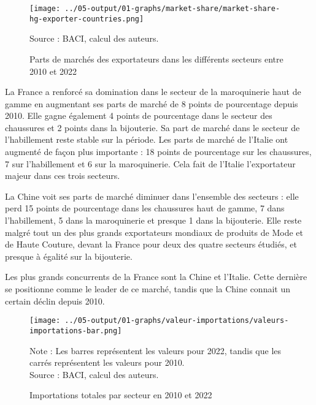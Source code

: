 \documentclass[french,10pt,a4paper]{article}
\begin{document}
\begin{figure}[!h]
  \centering
  \texttt{[image: ../05-output/01-graphs/market-share/market-share-hg-exporter-countries.png]}
  \captionsetup{justification=raggedright,singlelinecheck=false, font=small}
  \caption*{Source : BACI, calcul des auteurs.}
  \captionsetup{justification=centering, singlelinecheck=true, font=normalsize}
  \caption{Parts de marchés des exportateurs dans les différents secteurs entre 2010 et 2022}
  \label{fig:market-share}
\end{figure}

\bigskip

La France a renforcé sa domination dans le secteur de la maroquinerie haut de gamme en augmentant ses parts de marché de 8 points de pourcentage depuis 2010. Elle gagne également 4 points de pourcentage dans le secteur des chaussures et 2 points dans la bijouterie. Sa part de marché dans le secteur de l'habillement reste stable sur la période. Les parts de marché de l'Italie ont augmenté de façon plus importante : 18 points de pourcentage sur les chaussures, 7 sur l'habillement et 6 sur la maroquinerie. Cela fait de l'Italie l'exportateur majeur dans ces trois secteurs.

La Chine voit ses parts de marché diminuer dans l'ensemble des secteurs : elle perd 15 points de pourcentage dans les chaussures haut de gamme, 7 dans l'habillement, 5 dans la maroquinerie et presque 1 dans la bijouterie. Elle reste malgré tout un des plus grands exportateurs mondiaux de produits de Mode et de Haute Couture, devant la France pour deux des quatre secteurs étudiés, et presque à égalité sur la bijouterie.

Les plus grands concurrents de la France sont la Chine et l'Italie. Cette dernière se positionne comme le leader de ce marché, tandis que la Chine connait un certain déclin depuis 2010.

\bigskip

\begin{figure}[!h]
  \centering
  \texttt{[image: ../05-output/01-graphs/valeur-importations/valeurs-importations-bar.png]}
  \captionsetup{justification=raggedright,singlelinecheck=false, font=small}
  \caption*{Note : Les barres représentent les valeurs pour 2022, tandis que les carrés représentent les valeurs pour 2010. \\
  Source : BACI, calcul des auteurs.}
  \captionsetup{justification=centering, singlelinecheck=true, font=normalsize}
  \caption{Importations totales par secteur en 2010 et 2022}
  \label{fig:valeurs-importations}
\end{figure}
\end{document}
